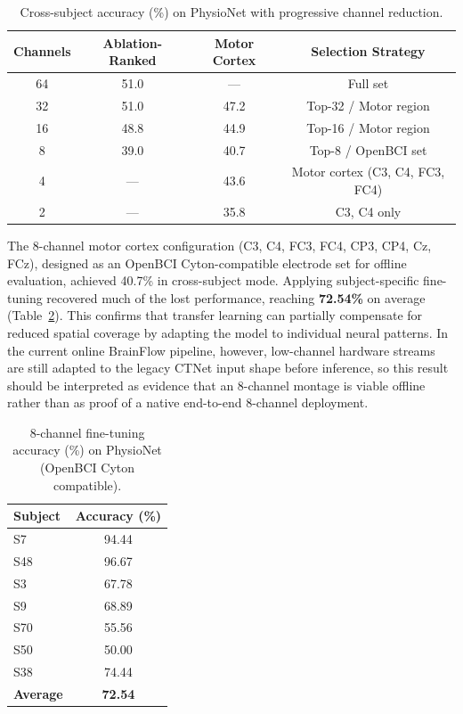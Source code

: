 \documentclass[12pt, a4paper]{article}
\begin{document}
\begin{table}[htbp]
\centering
\caption{Cross-subject accuracy (\%) on PhysioNet with progressive channel reduction.}
\label{tab:channel_reduction}
\begin{tabular}{cccc}
\toprule
\textbf{Channels} & \textbf{Ablation-Ranked} & \textbf{Motor Cortex} & \textbf{Selection Strategy} \\
\midrule
64 & 51.0 & --- & Full set \\
32 & 51.0 & 47.2 & Top-32 / Motor region \\
16 & 48.8 & 44.9 & Top-16 / Motor region \\
8  & 39.0 & 40.7 & Top-8 / OpenBCI set \\
4  & --- & 43.6 & Motor cortex (C3, C4, FC3, FC4) \\
2  & --- & 35.8 & C3, C4 only \\
\bottomrule
\end{tabular}
\end{table}

The 8-channel motor cortex configuration (C3, C4, FC3, FC4, CP3, CP4, Cz, FCz), designed as an OpenBCI Cyton-compatible electrode set for offline evaluation, achieved 40.7\% in cross-subject mode. Applying subject-specific fine-tuning recovered much of the lost performance, reaching \textbf{72.54\%} on average (Table~\ref{tab:8ch_finetune}). This confirms that transfer learning can partially compensate for reduced spatial coverage by adapting the model to individual neural patterns. In the current online BrainFlow pipeline, however, low-channel hardware streams are still adapted to the legacy CTNet input shape before inference, so this result should be interpreted as evidence that an 8-channel montage is viable offline rather than as proof of a native end-to-end 8-channel deployment.

\begin{table}[htbp]
\centering
\caption{8-channel fine-tuning accuracy (\%) on PhysioNet (OpenBCI Cyton compatible).}
\label{tab:8ch_finetune}
\begin{tabular}{lc}
\toprule
\textbf{Subject} & \textbf{Accuracy (\%)} \\
\midrule
S7  & 94.44 \\
S48 & 96.67 \\
S3  & 67.78 \\
S9  & 68.89 \\
S70 & 55.56 \\
S50 & 50.00 \\
S38 & 74.44 \\
\midrule
\textbf{Average} & \textbf{72.54} \\
\bottomrule
\end{tabular}
\end{table}
\end{document}
